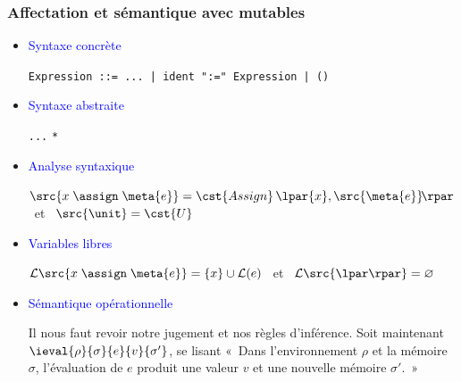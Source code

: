 %
\begin{frame}[containsverbatim]
\frametitle{Affectation et sémantique avec mutables}

\begin{itemize}

  \item \textcolor{blue}{Syntaxe concrète}

    {\small \verb+Expression ::= ... | ident ":=" Expression | ()+}

  \item \textcolor{blue}{Syntaxe abstraite}

    {\small
     \Xtype {} \equal \texttt{...} \vbar {} \Xof
     \texttt{*}  \vbar {}\semi{}
    }

  \item \textcolor{blue}{Analyse syntaxique}

  $\src{x \; \assign \; \meta{e}} = \cst{Assign} \, \lpar{x},
  \src{\meta{e}}\!\rpar$ \ et \ $\src{\unit} = \cst{U}$

  \item \textcolor{blue}{Variables libres}

  ${\cal L} \src{x \; \assign \; \meta{e}} = \{x\} \cup {\cal L} (e)$
  \ et \ ${\cal L} \src{\lpar\rpar} = \varnothing$

  \item \textcolor{blue}{Sémantique opérationnelle}

  Il nous faut revoir notre jugement et nos règles d'inférence. Soit
  maintenant $\ieval{\rho}{\sigma}{e}{v}{\sigma'}$, se lisant «~Dans
  l'environnement $\rho$ et la mémoire $\sigma$, l'évaluation de $e$
  produit une valeur $v$ et une nouvelle mémoire $\sigma'$.~»

\end{itemize}

\end{frame}

